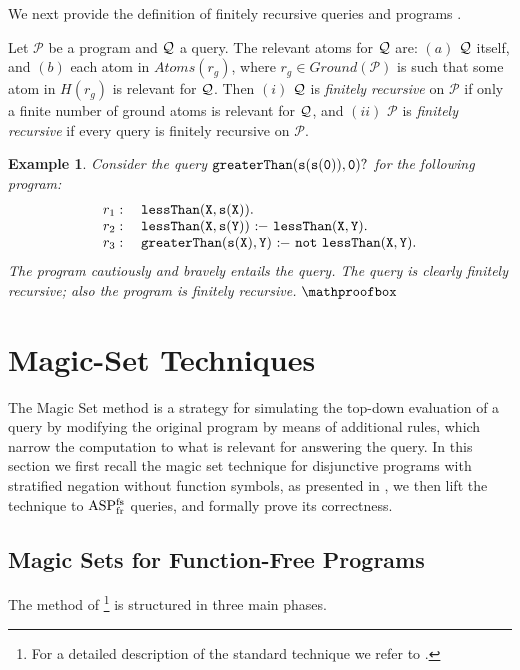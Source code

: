 \documentclass{tlp}
\newcommand{\derives}{\ensuremath{\mathtt{\ :\!\!-}\ }}
\newcommand{\p}{\ensuremath{{\mathcal{P}}}}
\newcommand{\GP}{\ensuremath{Ground(\p)}}
\newcommand{\R}{\ensuremath{r}}
\newcommand{\naf}{\ensuremath{\mathtt{not}}\xspace}
\newcommand{\q}{\ensuremath{{\cal Q}}}
\newcommand{\head}[1]{\ensuremath{H(#1)}}
\newcommand{\atoms}[1]{\ensuremath{Atoms(#1)}}
\newenvironment{dlvcode}
  {\begin{displaymath}\begin{array}{l}}
  {\end{array}\end{displaymath}}
\newtheorem{example}[theorem]{Example}
\newcommand{\ASPFNFR}{\ensuremath{\rm ASP^{\rm fs}_{\rm fr}}}
\begin{document}
We next provide the definition of finitely recursive queries \cite{cali-etal-2009-lpnmr}
and programs \cite{base-etal-2009-tplp}.

Let $\p$ be a program and $\q$ a query.
The relevant atoms for $\q$ are:
$(a)$ $\q$ itself, and $(b)$ each atom in $\atoms{\R_g}$, where $\R_g \in \GP$ is such that
some atom in $\head{\R_g}$ is relevant for $\q$.
Then $(i)$ $\q$ is {\em finitely recursive} on $\p$ if
only a finite number of ground atoms is relevant for $\q$,
and $(ii)$ $\p$ is {\em finitely recursive} if every query is finitely recursive on $\p$.

\begin{example}\label{ex:finitely_recursive}
Consider the query $\tt greaterThan(s(s(0)),0)?$ for the following program:
\begin{dlvcode}
\R_1:\quad \tt lessThan(X,s(X)). \\
\R_2:\quad \tt lessThan(X,s(Y)) \derives lessThan(X,Y). \\
\R_3:\quad \tt greaterThan(s(X),Y) \derives \naf~lessThan(X,Y).
\end{dlvcode}The program cautiously and bravely entails the query.
The query is clearly finitely recursive; also the program is finitely recursive.
$\mathproofbox$
\end{example}


\section{Magic-Set Techniques}\label{sec:magic}

The Magic Set method is a strategy for simulating the top-down
evaluation of a query by modifying the original program by means of
additional rules, which narrow the computation to what is relevant for
answering the query.  In this section we first recall the magic set
technique for disjunctive programs with stratified negation without
function symbols, as presented in
\cite{alvi-etal-2009-TR}, we then lift the technique to
\ASPFNFR{} queries, and
formally prove its correctness.


\subsection{Magic Sets for Function-Free Programs}
\label{sec:msFuncFree}

The method of \cite{alvi-etal-2009-TR}\footnote{For
a detailed description of the standard technique we refer to \cite{ullm-89}.} is structured in three main phases.
\end{document}
